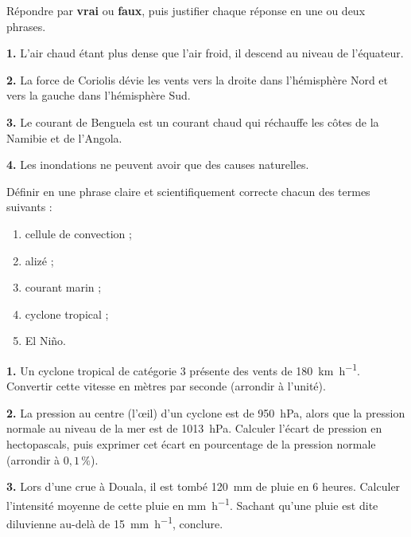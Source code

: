 \documentclass[11pt]{article}
\newcounter{popsec}
\newcounter{popsub}
\newcommand{\courssub}[1]{%
  \stepcounter{popsub}%
  \par\vspace{9pt}\noindent{\popxbold\fontsize{11.5}{13}\selectfont\color{popink}{\color{poporange}\thepopsec.\thepopsub}\hspace{6pt}#1}\par\nopagebreak\vspace{4pt}
}
\begin{document}
\begin{exercice}
Répondre par \textbf{vrai} ou \textbf{faux}, puis justifier chaque réponse en une ou deux phrases.

\textbf{1.} L'air chaud étant plus dense que l'air froid, il descend au niveau de l'équateur.

\textbf{2.} La force de Coriolis dévie les vents vers la droite dans l'hémisphère Nord et vers la gauche dans l'hémisphère Sud.

\textbf{3.} Le courant de Benguela est un courant chaud qui réchauffe les côtes de la Namibie et de l'Angola.

\textbf{4.} Les inondations ne peuvent avoir que des causes naturelles.
\end{exercice}

\begin{exercice}[Définitions]
Définir en une phrase claire et scientifiquement correcte chacun des termes suivants :
\begin{enumerate}
\item cellule de convection ;
\item alizé ;
\item courant marin ;
\item cyclone tropical ;
\item El Niño.
\end{enumerate}
\end{exercice}

\begin{exercice}
\textbf{1.} Un cyclone tropical de catégorie 3 présente des vents de \SI{180}{km.h^{-1}}. Convertir cette vitesse en mètres par seconde (arrondir à l'unité).

\textbf{2.} La pression au centre (l'\oe il) d'un cyclone est de \SI{950}{hPa}, alors que la pression normale au niveau de la mer est de \SI{1013}{hPa}. Calculer l'écart de pression en hectopascals, puis exprimer cet écart en pourcentage de la pression normale (arrondir à $0,1\,\%$).

\textbf{3.} Lors d'une crue à Douala, il est tombé \SI{120}{mm} de pluie en 6 heures. Calculer l'intensité moyenne de cette pluie en \si{mm.h^{-1}}. Sachant qu'une pluie est dite diluvienne au-delà de \SI{15}{mm.h^{-1}}, conclure.
\end{exercice}

\courssub{Je m'entraîne}
\end{document}

